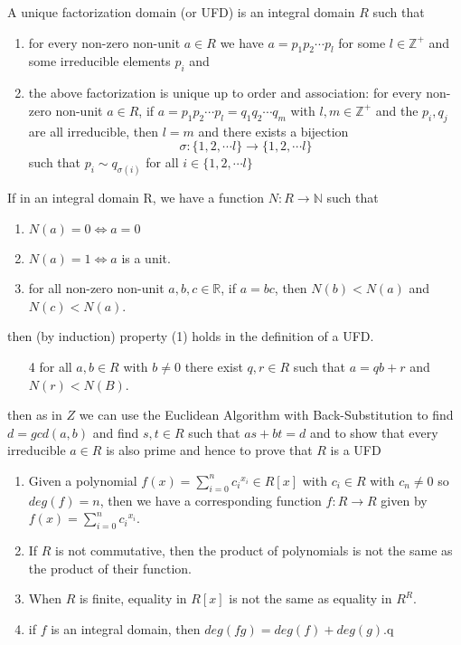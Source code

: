 
\begin{defn}
A unique factorization domain (or UFD) is an integral domain $R$ such that 
\begin{enumerate}
    \item for every non-zero non-unit $a\in R$ we have $a = p_1p_2\cdots p_l$ for some $l\in\mathbb{Z}^+$ and some irreducible elements $p_i$ and
    \item the above factorization is unique up to order and association: for every non-zero non-unit $a\in R$, if $a = p_1p_2\cdots p_l = q_1q_2\cdots q_m$ with $l,m\in\mathbb{Z}^+$ and the $p_i,q_j$ are all irreducible, then $l=m$ and there exists a bijection \[\sigma \colon \{1,2,\cdots l\} \to \{1,2,\cdots l\}\] such that $p_i \sim q_{\sigma (i)}$ for all $i\in \{1,2,\cdots l\}$
\end{enumerate}
\end{defn}

\begin{note}
If in an integral domain R, we have a function $N\colon R\to \mathbb{N}$ such that 
\begin{enumerate}
\item $N(a) = 0 \Leftrightarrow a = 0$
\item $N(a) = 1 \Leftrightarrow a$ is a unit.
\item for all non-zero non-unit $a,b,c\in\mathbb{R}$, if $a = bc$, then $N(b) < N(a)$ and $N(c) < N(a)$.
\end{enumerate}
then (by induction) property (1) holds in the definition of a UFD. 
\begin{enumerate}
\item[4] for all $a,b\in R$ with $b\neq 0$ there exist $q,r \in R$ such that $a = qb + r$ and $N(r) < N(B)$.
\end{enumerate}
then as in $Z$ we can use the Euclidean Algorithm with Back-Substitution to find $d = gcd(a,b)$ and find $s,t\in R$ such that $as+bt = d$ and to show that every irreducible $a \in R$ is also prime and hence to prove that $R$ is a UFD
\end{note}


\begin{rem}\leavevmode

\begin{enumerate}
\item Given a polynomial $f(x) = \sum_{i=0}^n {c_i}^{x_i}\in R[x]$ with $c_i \in R$ with $c_n \neq 0$ so $deg(f) = n$, then we have a corresponding function $f\colon R\to R$ given by $f(x) = \sum_{i=0}^n {c_i}^{x_i}$.
\item If $R$ is not commutative, then the product of polynomials is not the same as the product of their function. 
\item When $R$ is finite, equality in $R[x]$ is not the same as equality in $R^R$.
\item if $f$ is an integral domain, then $deg(fg) = deg(f) + deg(g)$.q
\end{enumerate}
\end{rem}